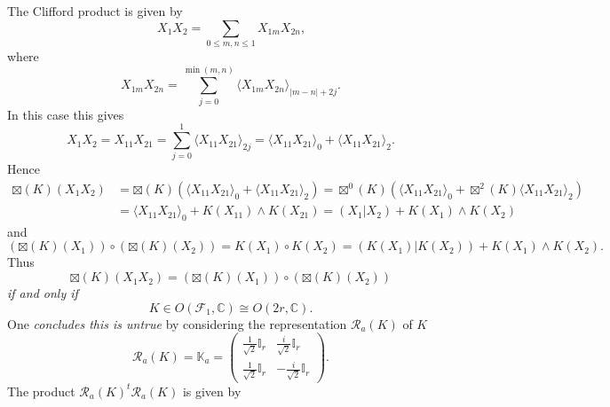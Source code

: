 \documentclass[aps, preprint]{revtex4}
\begin{document}
The Clifford product is given by
\begin{equation}X_{1} X_{2} =\sum _{0 \leq m ,n \leq 1}X_{1 m} X_{2 n}\text{,}
\end{equation}where
\begin{equation}X_{1 m} X_{2 n} =\sum _{j =0}^{\min \left (m ,n\right )} \langle X_{1 m} X_{2 n} \rangle _{\left \vert m -n\right \vert  +2 j}\text{.}
\end{equation}In this case this gives
\begin{equation}X_{1} X_{2} =X_{1 1} X_{2 1} =\sum _{j =0}^{1} \langle X_{1 1} X_{2 1} \rangle _{2 j} = \langle X_{1 1} X_{2 1} \rangle _{0} + \langle X_{1 1} X_{2 1} \rangle _{2}\text{.}
\end{equation}Hence
\begin{align} \boxtimes \left (K\right ) \left (X_{1} X_{2}\right ) &   = \boxtimes \left (K\right ) \left ( \langle X_{1 1} X_{2 1} \rangle _{0} + \langle X_{1 1} X_{2 1} \rangle _{2}\right ) = \boxtimes ^{0}\left (K\right ) \left ( \langle X_{1 1} X_{2 1} \rangle _{0} + \boxtimes ^{2}\left (K\right )  \langle X_{1 1} X_{2 1} \rangle _{2}\right ) \\
 &  = \langle X_{1 1} X_{2 1} \rangle _{0} +K \left (X_{1 1}\right ) \wedge K \left (X_{2 1}\right ) =\left (\left .X_{1}\right \vert X_{2}\right ) +K \left (X_{1}\right ) \wedge K \left (X_{2}\right )\end{align}and
\begin{equation}\left ( \boxtimes \left (K\right ) \left (X_{1}\right )\right ) \circ \left ( \boxtimes \left (K\right ) \left (X_{2}\right )\right ) =K \left (X_{1}\right ) \circ K \left (X_{2}\right ) =\left (\left .K \left (X_{1}\right )\right \vert K \left (X_{2}\right )\right ) +K \left (X_{1}\right ) \wedge K \left (X_{2}\right )\text{.}
\end{equation}Thus
\begin{equation} \boxtimes \left (K\right ) \left (X_{1} X_{2}\right ) =\left ( \boxtimes \left (K\right ) \left (X_{1}\right )\right ) \circ \left ( \boxtimes \left (K\right ) \left (X_{2}\right )\right )
\end{equation}\emph{if and only if }
\begin{equation}K \in O \left (\mathcal{F}_{1} ,\mathbb{C}\right ) \cong O \left (2 r ,\mathbb{C}\right )\text{.}
\end{equation}One \emph{concludes this is untrue} by considering the representation $\mathcal{R}_{a} \left (K\right )$ of $K$
\begin{equation}\mathcal{R}_{a} \left (K\right ) =\mathbb{K}_{a} =\left (\begin{array}{cc}\frac{1}{\sqrt{2}} \mathbb{I}_{r} & \frac{i}{\sqrt{2}} \mathbb{I}_{r} \\
\frac{1}{\sqrt{2}} \mathbb{I}_{r} &  -\frac{i}{\sqrt{2}} \mathbb{I}_{r}\end{array}\right )\text{.}
\end{equation}The product $\mathcal{R}_{a} \left (K\right )^{t} \mathcal{R}_{a} \left (K\right )$ is given by
\end{document}
